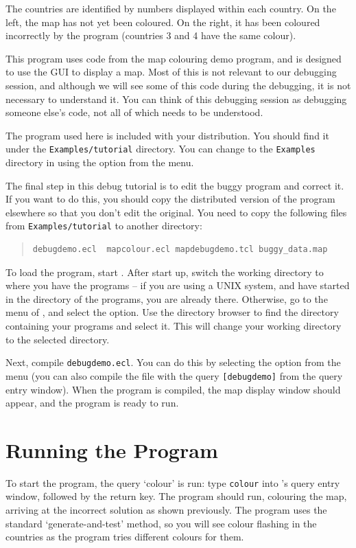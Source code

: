 The countries are identified by numbers displayed within each country. On the
left, the map has not yet been coloured. On the right, it has been coloured
incorrectly by the program (countries 3 and 4 have the same colour).

This program uses code from the map colouring demo program, and is
designed to use the GUI to display a map. Most of this is
not relevant to our debugging session, and although we will see some of this
code during the debugging, it is not necessary to understand it. 
You can think of this
debugging session as debugging someone else's code, not all of which
needs to be understood.

The program used here is included with your {\eclipse} distribution. You
should find it under the \texttt{Examples/tutorial} directory. You can
change to the \texttt{Examples} directory in {\tkeclipse} using the
 option from the  menu.

The final step in this debug tutorial is to edit the buggy program and
correct it. If you want to do this, you should copy the distributed version
of the program elsewhere so that you don't edit the original. You need to
copy the following files from \verb'Examples/tutorial' to another directory:

\begin{quote}\begin{verbatim}
debugdemo.ecl  mapcolour.ecl mapdebugdemo.tcl buggy_data.map
\end{verbatim}\end{quote}

To load the program, start {\tkeclipse}. After start up, 
switch the working directory to
where you have the programs -- if you are using a UNIX system, and have
started {\tkeclipse} in the directory of the programs, you are already
there. Otherwise, go to the  menu of {\tkeclipse}, and select
the  option. Use the directory browser to find
the directory containing your programs and select it. This will change your
working directory to the selected directory.

Next, compile \verb'debugdemo.ecl'. You can do this by selecting the
 option from the  menu (you can also compile
the file with the query \verb'[debugdemo]' from the query entry
window). When the program is compiled, the map display window should
appear, and the program is  ready to run.

\section{Running the Program}
To start the program, the query `colour' is run: type \verb'colour' 
into {\tkeclipse}'s query entry window, followed by the
return key. The program should run, colouring the map, arriving at the
incorrect solution as shown previously. The program uses
the standard `generate-and-test' method, so you will see colour flashing in
the countries as the program tries different colours for them.

